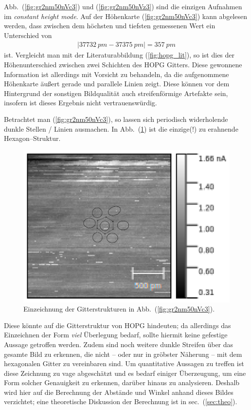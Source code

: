\documentclass[sn-mathphys-num,iicol]{sn-jnl}
\theoremstyle{thmstyleone}
\theoremstyle{thmstyletwo}
\theoremstyle{thmstylethree}
\begin{document}
Abb.\ (\ref{fig:gr2nm50nVc3}) und (\ref{fig:gr2nm50nVz3}) sind die einzigen Aufnahmen im \textit{constant height mode}.
Auf der Höhenkarte (\ref{fig:gr2nm50nVc3}) kann abgelesen werden, dass zwischen dem höchsten und tiefsten gemessenen Wert ein Unterschied von
\begin{align} 
  |\SI{37732}{pm}-\SI{37375}{pm}|=\SI{357}{pm}
\end{align} 
ist.
Vergleicht man mit der Literaturabbildung (\ref{fig:hopg_lit}), so ist dies der Höhenunterschied zwischen zwei Schichten des HOPG Gitters.
Diese gewonnene Information ist allerdings mit Vorsicht zu behandeln, da die aufgenommene Höhenkarte äußert gerade und parallele Linien zeigt.
Diese können vor dem Hintergrund der sonstigen Bildqualität auch streifenförmige Artefakte sein, insofern ist dieses Ergebnis nicht vertrauenswürdig.

Betrachtet man (\ref{fig:gr2nm50nVc3}), so lassen sich periodisch widerholende dunkle Stellen / Linien ausmachen.
In Abb.\ (\ref{fig:hopg_sketch}) ist die einzige(!) zu erahnende Hexagon--Struktur.
\begin{figure}[t]
  \centering
  \includegraphics[width=.5\textwidth]{hopg_sketch-crop.pdf}
  \caption{Einzeichnung der Gitterstrukturen in Abb.\ (\ref{fig:gr2nm50nVc3}).} \label{fig:hopg_sketch}
\end{figure}
Diese könnte auf die Gitterstruktur von HOPG hindeuten; da allerdings das Einzeichnen der Form \textit{viel} Überlegung bedarf, sollte hiermit keine gefestige Aussage getroffen werden.
Zudem sind noch weitere dunkle Streifen über das gesamte Bild zu erkennen, die nicht -- oder nur in gröbster Näherung -- mit dem hexagonalen Gitter zu vereinbaren sind.
Um quantitative Aussagen zu treffen ist diese Zeichnung zu vage abgeschätzt und es bedarf einiger Überzeugung, um eine Form solcher Genauigkeit zu erkennen, darüber hinaus zu analysieren.
Deshalb wird hier auf die Berechnung der Abstände und Winkel anhand dieses Bildes verzichtet; eine theoretische Diskussion der Berechnung ist in sec.\ (\ref{sec:theo}).
\end{document}
